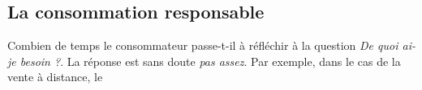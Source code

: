 \subsection{La consommation responsable}

Combien de temps le consommateur passe-t-il à réfléchir à la question \textit{De quoi ai-je besoin ?}. 
La réponse est sans doute \textit{pas assez}.
Par exemple, dans le cas de la vente à distance, le 